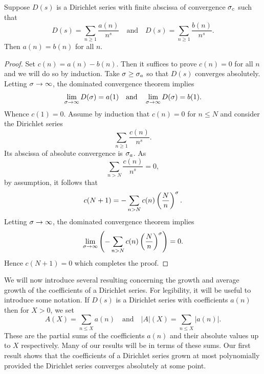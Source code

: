 \documentclass[12pt]{article}
\begin{document}
    \begin{proposition}\label{prop:coefficients_of_Dirichlet_series_are_unique}
      Suppose \(D(s)\) is a Dirichlet series with finite abscissa of convergence \(\sigma_{c}\) such that
      \[
        D(s) = \sum_{n \ge 1}\frac{a(n)}{n^{s}} \quad \text{and} \quad D(s) = \sum_{n \ge 1}\frac{b(n)}{n^{s}}.
      \]
      Then \(a(n) = b(n)\) for all \(n\).
    \end{proposition}
    \begin{proof}
      Set \(c(n) = a(n)-b(n)\). Then it suffices to prove \(c(n) = 0\) for all \(n\) and we will do so by induction. Take \(\sigma \ge \sigma_{a}\) so that \(D(s)\) converges absolutely. Letting \(\sigma \to \infty\), the dominated convergence theorem implies
      \[
        \lim_{\sigma \to \infty}D(\sigma) = a(1) \quad \text{and} \quad \lim_{\sigma \to \infty}D(\sigma) = b(1).
      \]
      Whence \(c(1) = 0\). Assume by induction that \(c(n) = 0\) for \(n \le N\) and consider the Dirichlet series
      \[
        \sum_{n \ge 1}\frac{c(n)}{n^{s}}.
      \]
      Its abscissa of absolute convergence is \(\sigma_{a}\). As
      \[
        \sum_{n > N}\frac{c(n)}{n^{s}} = 0,
      \]
      by assumption, it follows that
      \[
        c(N+1) = -\sum_{n > N}c(n)\left(\frac{N}{n}\right)^{\sigma}.
      \]
      Letting \(\sigma \to \infty\), the dominated convergence theorem implies
      \[
        \lim_{\sigma \to \infty}\left(-\sum_{n > N}c(n)\left(\frac{N}{n}\right)^{\sigma}\right) = 0.
      \]
      Hence \(c(N+1) = 0\) which completes the proof.
    \end{proof}

    We will now introduce several resulting concerning the growth and average growth of the coefficients of a Dirichlet series. For legibility, it will be useful to introduce some notation. If \(D(s)\) is a Dirichlet series with coefficients \(a(n)\) then for \(X > 0\), we set
    \[
      A(X) = \sum_{n \le X}a(n) \quad \text{and} \quad |A|(X) = \sum_{n \le X}|a(n)|.
    \]
    These are the partial sums of the coefficients \(a(n)\) and their absolute values up to \(X\) respectively. Many of our results will be in terms of these sums. Our first result shows that the coefficients of a Dirichlet series grown at most polynomially provided the Dirichlet series converges absolutely at some point. 
    
\end{document}
